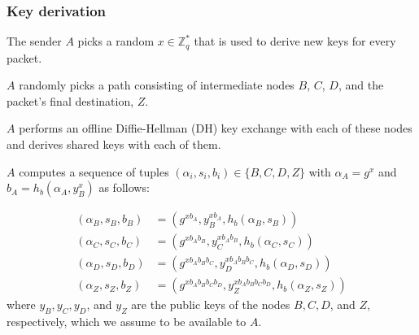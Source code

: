 \subsubsection{Key derivation}
\label{sec:sphinx:keyderivation}

The sender $A$ picks a random $x\in \mathbb{Z}^*_q$ that is used to derive new keys for every packet.

$A$ randomly picks a path consisting of intermediate nodes $B$, $C$, $D$, and the packet's final destination, $Z$.

$A$ performs an offline Diffie-Hellman (DH) key exchange with each of these nodes and derives shared keys with each of them.

$A$ computes a sequence of tuples $(\alpha_i,s_i,b_i) \in \{ B, C, D, Z \}$ with $\alpha_A = g^x$ and $b_A = h_b(\alpha_A, y_B^{x})$ as follows:

\begin{align}
    \nonumber(\alpha_B,s_B,b_B) & = (g^{x b_A},y_B^{x b_A},h_b(\alpha_B,s_B))                         \\
    \nonumber(\alpha_C,s_C,b_C) & = (g^{x b_A b_B},y_C^{x b_A b_B},h_b(\alpha_C,s_C))                 \\
    \nonumber(\alpha_D,s_D,b_D) & = (g^{x b_A b_B b_C},y_D^{x b_A b_B b_C},h_b(\alpha_D,s_D))         \\
    (\alpha_Z,s_Z,b_Z)          & = (g^{x b_A b_B b_C b_D},y_Z^{x b_A b_B b_C b_D},h_b(\alpha_Z,s_Z))
    \label{eq:1}
\end{align}
where $y_B, y_C, y_D$, and $y_Z$ are the public keys of the nodes $B, C, D$, and $Z$, respectively, which we assume to be available to $A$.

